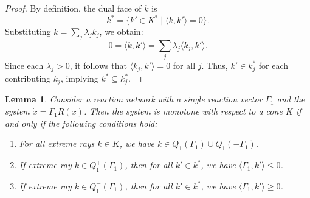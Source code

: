 \documentclass{article}
\newtheorem{lem}{Lemma}
\begin{document}
\begin{proof}
By definition, the dual face of \( k \) is
\[
k^* = \{ k' \in K^* \mid \langle k, k' \rangle = 0 \}.
\]
Substituting \( k = \sum_j \lambda_j k_j \), we obtain:
\[
0 = \langle k, k' \rangle = \sum_j \lambda_j \langle k_j, k' \rangle.
\]
Since each \( \lambda_j > 0 \), it follows that \( \langle k_j, k' \rangle = 0 \) for all \( j \). Thus, \( k' \in k_j^* \) for each contributing \( k_j \), implying \( k^* \subseteq k_j^* \).
\end{proof}



\begin{lem}
\label{lem:signs on dual faces}
Consider a reaction network with a single reaction vector $\Gamma_1$ and the system $\dot{x} = \Gamma_1 R(x)$. Then the system is monotone with respect to a cone $K$ if and only if the following conditions hold:

\begin{enumerate}
    \item For all extreme rays $k \in K$, we have $k \in Q_1(\Gamma_1) \cup Q_1(-\Gamma_1)$.
    \item If extreme ray $k \in Q_1^+(\Gamma_1)$, then for all $k' \in k^*$, we have $\langle \Gamma_1,k' \rangle \leq 0$.
    \item If extreme ray $k \in Q_1^-(\Gamma_1)$, then for all $k' \in k^*$, we have $\langle \Gamma_1,k' \rangle \geq 0$.
\end{enumerate}
\end{lem}
\end{document}
